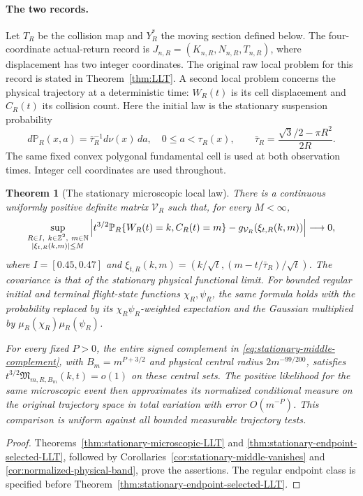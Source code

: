 \documentclass[11pt,reqno]{amsart}
\numberwithin{equation}{section}
\newtheorem{leadtheorem}{Theorem}
\theoremstyle{definition}\newtheorem{definition}[theorem]{Definition}
\theoremstyle{remark}\newtheorem{remark}[theorem]{Remark}
\begin{document}
\paragraph{The two records.}
Let $T_R$ be the collision map and $Y_R^*$ the moving section defined
below. The four-coordinate actual-return record is
$J_{n,R}=(K_{n,R},N_{n,R},T_{n,R})$, where displacement has two integer
coordinates. The original raw local problem for this record is stated
in Theorem~\ref{thm:LLT}. A second local problem concerns the physical
trajectory at a deterministic time: $W_R(t)$ is its cell displacement
and $C_R(t)$ its collision count. Here the initial law is the stationary
suspension probability
\[
 d\mathbb P_R(x,a)=\bar\tau_R^{-1}d\nu(x)\,da,
 \quad 0\le a<\tau_R(x),\qquad
 \bar\tau_R=\frac{\sqrt3/2-\pi R^2}{2R}.
\]
The same fixed convex polygonal fundamental cell is used at both
observation times. Integer cell coordinates are used throughout.

\begin{leadtheorem}[The stationary microscopic local law]
\label{thm:intro-stationary-microscopic}
There is a continuous uniformly positive definite matrix $\mathcal V_R$
such that, for every $M<\infty$,
\begin{equation}\label{eq:intro-stationary-local-law}
 \sup_{\substack{R\in I,\ k\in\mathbb Z^2,\ m\in\mathbb N\\
                     |\xi_{t,R}(k,m)|\le M}}
 \left|t^{3/2}\mathbb P_R\{W_R(t)=k,C_R(t)=m\}
              -g_{\mathcal V_R}(\xi_{t,R}(k,m))\right|\longrightarrow0,
\end{equation}
where $I=[0.45,0.47]$ and
$\xi_{t,R}(k,m)=(k/\sqrt t,(m-t/\bar\tau_R)/\sqrt t)$.
The covariance is that of the stationary physical functional limit.
For bounded regular initial and terminal flight-state functions
$\chi_R,\psi_R$, the same formula holds with the probability replaced
by its $\chi_R\psi_R$-weighted expectation and the Gaussian multiplied
by $\mu_R(\chi_R)\mu_R(\psi_R)$.

For every fixed $P>0$, the entire signed complement in
\eqref{eq:stationary-middle-complement}, with $B_m=m^{P+3/2}$ and
physical central radius $2m^{-99/200}$, satisfies
$t^{3/2}\mathfrak M_{m,R,B_m}(k,t)=o(1)$ on these central sets.
The positive likelihood for the same microscopic event then approximates
its normalized conditional measure on the original trajectory space
in total variation with error $O(m^{-P})$. This comparison is uniform
against all bounded measurable trajectory tests.
\end{leadtheorem}
\begin{proof}
Theorems~\ref{thm:stationary-microscopic-LLT} and
\ref{thm:stationary-endpoint-selected-LLT}, followed by
Corollaries~\ref{cor:stationary-middle-vanishes} and
\ref{cor:normalized-physical-band}, prove the assertions. The regular
endpoint class is specified before
Theorem~\ref{thm:stationary-endpoint-selected-LLT}.
\end{proof}
\end{document}
